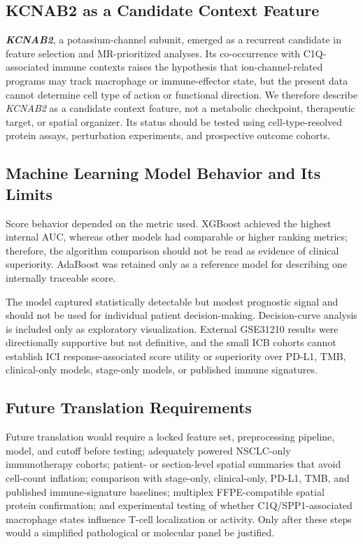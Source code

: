 \documentclass[pdflatex,sn-mathphys-num,referee,lineno]{sn-jnl}
\theoremstyle{thmstyleone}%
\theoremstyle{thmstyletwo}%
\theoremstyle{thmstylethree}%
\begin{document}
\subsection{KCNAB2 as a Candidate Context Feature}

\textbf{\textit{KCNAB2}}, a potassium-channel subunit, emerged as a recurrent candidate in feature selection and MR-prioritized analyses. Its co-occurrence with C1Q-associated immune contexts raises the hypothesis that ion-channel-related programs may track macrophage or immune-effector state, but the present data cannot determine cell type of action or functional direction. We therefore describe \textit{KCNAB2} as a candidate context feature, not a metabolic checkpoint, therapeutic target, or spatial organizer. Its status should be tested using cell-type-resolved protein assays, perturbation experiments, and prospective outcome cohorts.

\subsection{Machine Learning Model Behavior and Its Limits}

Score behavior depended on the metric used. XGBoost achieved the highest internal AUC, whereas other models had comparable or higher ranking metrics; therefore, the algorithm comparison should not be read as evidence of clinical superiority. AdaBoost was retained only as a reference model for describing one internally traceable score.

The model captured statistically detectable but modest prognostic signal and should not be used for individual patient decision-making. Decision-curve analysis is included only as exploratory visualization. External GSE31210 results were directionally supportive but not definitive, and the small ICB cohorts cannot establish ICI response-associated score utility or superiority over PD-L1, TMB, clinical-only models, stage-only models, or published immune signatures.

\subsection{Future Translation Requirements}

Future translation would require a locked feature set, preprocessing pipeline, model, and cutoff before testing; adequately powered NSCLC-only immunotherapy cohorts; patient- or section-level spatial summaries that avoid cell-count inflation; comparison with stage-only, clinical-only, PD-L1, TMB, and published immune-signature baselines; multiplex FFPE-compatible spatial protein confirmation; and experimental testing of whether C1Q/SPP1-associated macrophage states influence T-cell localization or activity. Only after these steps would a simplified pathological or molecular panel be justified.
\end{document}
